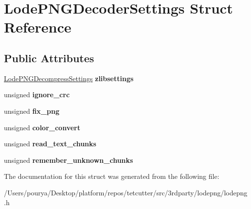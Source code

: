 \hypertarget{structLodePNGDecoderSettings}{}\section{Lode\+P\+N\+G\+Decoder\+Settings Struct Reference}
\label{structLodePNGDecoderSettings}
\subsection*{Public Attributes}
\begin{DoxyCompactItemize}
\item 
\hypertarget{structLodePNGDecoderSettings_a9ae8fef9880bef97a3e932f8ea942ed8}{}\hyperlink{structLodePNGDecompressSettings}{Lode\+P\+N\+G\+Decompress\+Settings} {\bfseries zlibsettings}\label{structLodePNGDecoderSettings_a9ae8fef9880bef97a3e932f8ea942ed8}

\item 
\hypertarget{structLodePNGDecoderSettings_a6390c403d2a5718242337bbbaf15131d}{}unsigned {\bfseries ignore\+\_\+crc}\label{structLodePNGDecoderSettings_a6390c403d2a5718242337bbbaf15131d}

\item 
\hypertarget{structLodePNGDecoderSettings_abaaeec14170c4a37832543c0af6c44b9}{}unsigned {\bfseries fix\+\_\+png}\label{structLodePNGDecoderSettings_abaaeec14170c4a37832543c0af6c44b9}

\item 
\hypertarget{structLodePNGDecoderSettings_af26f2b29cd338ce4476bee9571a0818a}{}unsigned {\bfseries color\+\_\+convert}\label{structLodePNGDecoderSettings_af26f2b29cd338ce4476bee9571a0818a}

\item 
\hypertarget{structLodePNGDecoderSettings_aa1212905c3f73d9fffef2c04a220d951}{}unsigned {\bfseries read\+\_\+text\+\_\+chunks}\label{structLodePNGDecoderSettings_aa1212905c3f73d9fffef2c04a220d951}

\item 
\hypertarget{structLodePNGDecoderSettings_a8775e4fc539dc457916720f52b442f27}{}unsigned {\bfseries remember\+\_\+unknown\+\_\+chunks}\label{structLodePNGDecoderSettings_a8775e4fc539dc457916720f52b442f27}

\end{DoxyCompactItemize}


The documentation for this struct was generated from the following file\+:\begin{DoxyCompactItemize}
\item 
/\+Users/pourya/\+Desktop/platform/repos/tetcutter/src/3rdparty/lodepng/lodepng.\+h\end{DoxyCompactItemize}
